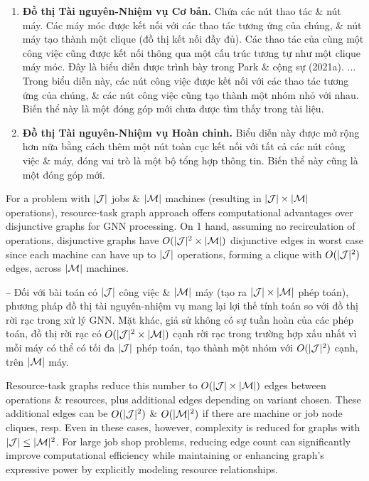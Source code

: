 \documentclass{article}
\begin{document}
\begin{itemize}
\begin{itemize}
\begin{itemize}
            \begin{enumerate}
                \item {\bf Đồ thị Tài nguyên-Nhiệm vụ Cơ bản.} Chứa các nút thao tác \& nút máy. Các máy móc được kết nối với các thao tác tương ứng của chúng, \& nút máy tạo thành một clique (đồ thị kết nối đầy đủ). Các thao tác của cùng một công việc cũng được kết nối thông qua một cấu trúc tương tự như một clique máy móc. Đây là biểu diễn được trình bày trong Park \& cộng sự (2021a).
                ... Trong biểu diễn này, các nút công việc được kết nối với các thao tác tương ứng của chúng, \& các nút công việc cũng tạo thành một nhóm nhỏ với nhau. Biến thể này là một đóng góp mới chưa được tìm thấy trong tài liệu.
                \item {\bf Đồ thị Tài nguyên-Nhiệm vụ Hoàn chỉnh.} Biểu diễn này được mở rộng hơn nữa bằng cách thêm một nút toàn cục kết nối với tất cả các nút công việc \& máy, đóng vai trò là một bộ tổng hợp thông tin. Biến thể này cũng là một đóng góp mới.
            \end{enumerate}
            For a problem with $|{\cal J}|$ jobs \& $|{\cal M}|$ machines (resulting in $|{\cal J}|\times|{\cal M}|$ operations), resource-task graph approach offers computational advantages over disjunctive graphs for GNN processing. On 1 hand, assuming no recirculation of operations, disjunctive graphs have $O(|{\cal J}|^2\times|{\cal M}|)$ disjunctive edges in worst case since each machine can have up to $|{\cal J}|$ operations, forming a clique with $O(|{\cal J}|^2)$ edges, across $|{\cal M}|$ machines.

            -- Đối với bài toán có $|{\cal J}|$ công việc \& $|{\cal M}|$ máy (tạo ra $|{\cal J}|\times|{\cal M}|$ phép toán), phương pháp đồ thị tài nguyên-nhiệm vụ mang lại lợi thế tính toán so với đồ thị rời rạc trong xử lý GNN. Mặt khác, giả sử không có sự tuần hoàn của các phép toán, đồ thị rời rạc có $O(|{\cal J}|^2\times|{\cal M}|)$ cạnh rời rạc trong trường hợp xấu nhất vì mỗi máy có thể có tối đa $|{\cal J}|$ phép toán, tạo thành một nhóm với $O(|{\cal J}|^2)$ cạnh, trên $|{\cal M}|$ máy.

            Resource-task graphs reduce this number to $O(|{\cal J}|\times|{\cal M}|)$ edges between operations \& resources, plus additional edges depending on variant chosen. These additional edges can be $O(|{\cal J}|^2)$ \& $O(|{\cal M}|^2)$ if there are machine or job node cliques, resp. Even in these cases, however, complexity is reduced for graphs with $|{\cal J}|\le|{\cal M}|^2$. For large job shop problems, reducing edge count can significantly improve computational efficiency while maintaining or enhancing graph's expressive power by explicitly modeling resource relationships.


\end{itemize}
\end{itemize}
\end{itemize}
\end{document}
